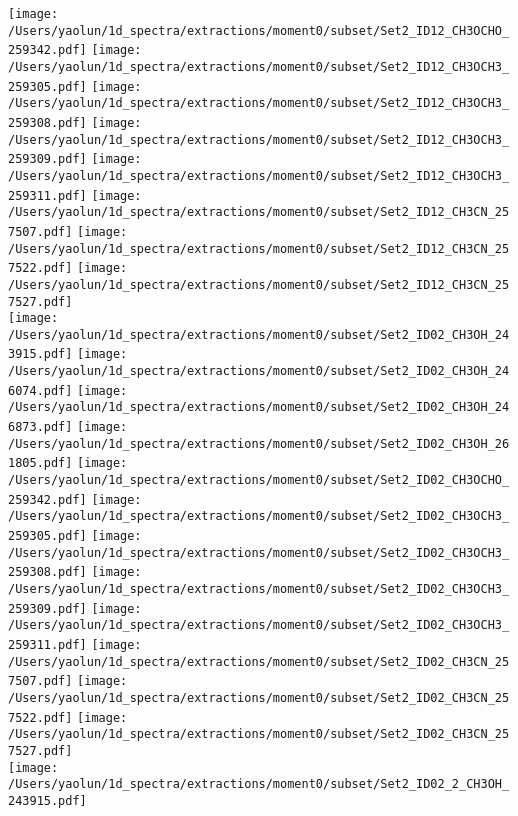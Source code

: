 \begin{figure*}[htbp!]
  \texttt{[image: /Users/yaolun/1d\_spectra/extractions/moment0/subset/Set2\_ID12\_CH3OCHO\_259342.pdf]}
  \texttt{[image: /Users/yaolun/1d\_spectra/extractions/moment0/subset/Set2\_ID12\_CH3OCH3\_259305.pdf]}
  \texttt{[image: /Users/yaolun/1d\_spectra/extractions/moment0/subset/Set2\_ID12\_CH3OCH3\_259308.pdf]}
  \texttt{[image: /Users/yaolun/1d\_spectra/extractions/moment0/subset/Set2\_ID12\_CH3OCH3\_259309.pdf]}
  \texttt{[image: /Users/yaolun/1d\_spectra/extractions/moment0/subset/Set2\_ID12\_CH3OCH3\_259311.pdf]}
  \texttt{[image: /Users/yaolun/1d\_spectra/extractions/moment0/subset/Set2\_ID12\_CH3CN\_257507.pdf]}
  \texttt{[image: /Users/yaolun/1d\_spectra/extractions/moment0/subset/Set2\_ID12\_CH3CN\_257522.pdf]}
  \texttt{[image: /Users/yaolun/1d\_spectra/extractions/moment0/subset/Set2\_ID12\_CH3CN\_257527.pdf]}
  \\
  \texttt{[image: /Users/yaolun/1d\_spectra/extractions/moment0/subset/Set2\_ID02\_CH3OH\_243915.pdf]}
  \texttt{[image: /Users/yaolun/1d\_spectra/extractions/moment0/subset/Set2\_ID02\_CH3OH\_246074.pdf]}
  \texttt{[image: /Users/yaolun/1d\_spectra/extractions/moment0/subset/Set2\_ID02\_CH3OH\_246873.pdf]}
  \texttt{[image: /Users/yaolun/1d\_spectra/extractions/moment0/subset/Set2\_ID02\_CH3OH\_261805.pdf]}
  \texttt{[image: /Users/yaolun/1d\_spectra/extractions/moment0/subset/Set2\_ID02\_CH3OCHO\_259342.pdf]}
  \texttt{[image: /Users/yaolun/1d\_spectra/extractions/moment0/subset/Set2\_ID02\_CH3OCH3\_259305.pdf]}
  \texttt{[image: /Users/yaolun/1d\_spectra/extractions/moment0/subset/Set2\_ID02\_CH3OCH3\_259308.pdf]}
  \texttt{[image: /Users/yaolun/1d\_spectra/extractions/moment0/subset/Set2\_ID02\_CH3OCH3\_259309.pdf]}
  \texttt{[image: /Users/yaolun/1d\_spectra/extractions/moment0/subset/Set2\_ID02\_CH3OCH3\_259311.pdf]}
  \texttt{[image: /Users/yaolun/1d\_spectra/extractions/moment0/subset/Set2\_ID02\_CH3CN\_257507.pdf]}
  \texttt{[image: /Users/yaolun/1d\_spectra/extractions/moment0/subset/Set2\_ID02\_CH3CN\_257522.pdf]}
  \texttt{[image: /Users/yaolun/1d\_spectra/extractions/moment0/subset/Set2\_ID02\_CH3CN\_257527.pdf]}
  \\
  \texttt{[image: /Users/yaolun/1d\_spectra/extractions/moment0/subset/Set2\_ID02\_2\_CH3OH\_243915.pdf]}

\end{figure*}
